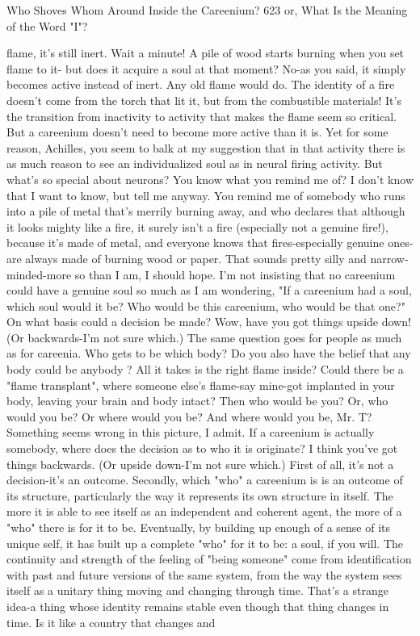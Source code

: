 Who Shoves Whom Around Inside the Careenium?                                        623
or, What Is the Meaning of the Word "I"?

  flame, it's still inert.
\tortoise Wait a minute! A pile of wood starts burning when you set flame to it-
  but does it acquire a soul at that moment? No-as you said, it simply becomes active
  instead of inert. Any old flame would do. The identity of a fire doesn't come from
  the torch that lit it, but from the combustible materials! It's the transition from
  inactivity to activity that makes the flame seem so critical. But a careenium doesn't
  need to become more active than it is. Yet for some reason, Achilles, you seem to
  balk at my suggestion that in that activity there is as much reason to see an
  individualized soul as in neural firing activity. But what's so special about neurons?
  You know what you remind me of?
\achilles I don't know that I want to know, but tell me anyway.
\tortoise You remind me of somebody who runs into a pile of metal that's merrily
  burning away, and who declares that although it looks mighty like a fire, it surely
  isn't a fire (especially not a genuine fire!), because it's made of metal, and everyone
  knows that fires-especially genuine ones-are always made of burning wood or
  paper.
\achilles That sounds pretty silly and narrow-minded-more so than I am, I should
  hope. I'm not insisting that no careenium could have a genuine soul so much as I
  am wondering, "If a careenium had a soul, which soul would it be? Who would be
  this careenium, who would be that one?" On what basis could a decision be made?
\tortoise Wow, have you got things upside down! (Or backwards-I'm not sure
  which.) The same question goes for people as much as for careenia. Who gets to be
  which body? Do you also have the belief that any body could be anybody ? All it
  takes is the right flame inside? Could there be a "flame transplant", where someone
  else's flame-say mine-got implanted in your body, leaving your brain and body
  intact? Then who would be you? Or, who would you be? Or where would you be?
\achilles And where would you be, Mr. T? Something seems wrong in this
  picture, I admit. If a careenium is actually somebody, where does the decision as to
  who it is originate?
\tortoise I think you've got things backwards. (Or upside down-I'm not sure
  which.) First of all, it's not a decision-it's an outcome. Secondly, which "who" a
  careenium is is an outcome of its structure, particularly the way it represents its
  own structure in itself. The more it is able to see itself as an independent and
  coherent agent, the more of a "who" there is for it to be. Eventually, by building up
  enough of a sense of its unique self, it has built up a complete "who" for it to be: a
  soul, if you will. The continuity and strength of the feeling of "being someone"
  come from identification with past and future versions of the same system, from
  the way the system sees itself as a unitary thing moving and changing through
  time.
\achilles That's a strange idea-a thing whose identity remains stable even though
  that thing changes in time. Is it like a country that changes and




